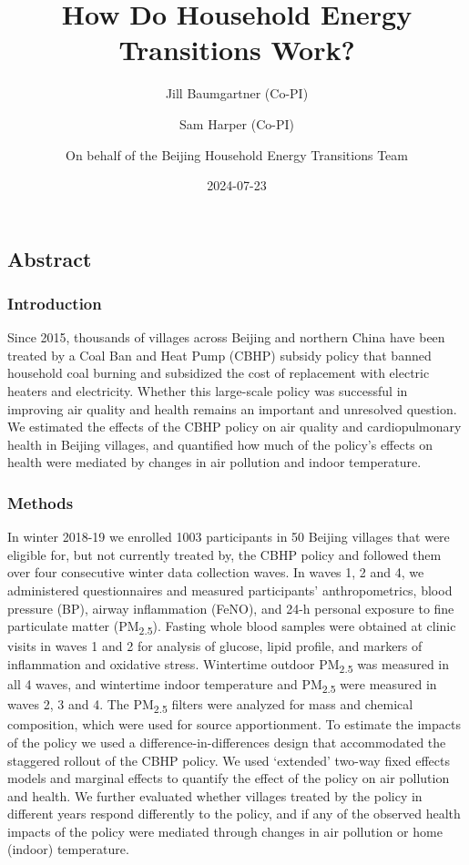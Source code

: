 \documentclass[
  letterpaper,
  DIV=11,
  numbers=noendperiod]{scrartcl}
\title{How Do Household Energy Transitions Work?}
\author{Jill Baumgartner (Co-PI) \and Sam Harper (Co-PI) \and On behalf
of the Beijing Household Energy Transitions Team}
\date{2024-07-23}
\renewcommand*\contentsname{Table of contents}
\newcommand\contentsname{Table of contents}
\begin{document}
\maketitle
\renewcommand*\contentsname{Table of contents}
{
\hypersetup{linkcolor=}
\setcounter{tocdepth}{3}
\tableofcontents
}
\subsection*{Abstract}\label{abstract}

\subsubsection*{Introduction}\label{introduction}

Since 2015, thousands of villages across Beijing and northern China have
been treated by a Coal Ban and Heat Pump (CBHP) subsidy policy that
banned household coal burning and subsidized the cost of replacement
with electric heaters and electricity. Whether this large-scale policy
was successful in improving air quality and health remains an important
and unresolved question. We estimated the effects of the CBHP policy on
air quality and cardiopulmonary health in Beijing villages, and
quantified how much of the policy's effects on health were mediated by
changes in air pollution and indoor temperature.

\subsubsection*{Methods}\label{methods}

In winter 2018-19 we enrolled 1003 participants in 50 Beijing villages
that were eligible for, but not currently treated by, the CBHP policy
and followed them over four consecutive winter data collection waves. In
waves 1, 2 and 4, we administered questionnaires and measured
participants' anthropometrics, blood pressure (BP), airway inflammation
(FeNO), and 24-h personal exposure to fine particulate matter
(PM\textsubscript{2.5}). Fasting whole blood samples were obtained at
clinic visits in waves 1 and 2 for analysis of glucose, lipid profile,
and markers of inflammation and oxidative stress. Wintertime outdoor
PM\textsubscript{2.5} was measured in all 4 waves, and wintertime indoor
temperature and PM\textsubscript{2.5} were measured in waves 2, 3 and 4.
The PM\textsubscript{2.5} filters were analyzed for mass and chemical
composition, which were used for source apportionment. To estimate the
impacts of the policy we used a difference-in-differences design that
accommodated the staggered rollout of the CBHP policy. We used
`extended' two-way fixed effects models and marginal effects to quantify
the effect of the policy on air pollution and health. We further
evaluated whether villages treated by the policy in different years
respond differently to the policy, and if any of the observed health
impacts of the policy were mediated through changes in air pollution or
home (indoor) temperature.
\end{document}

